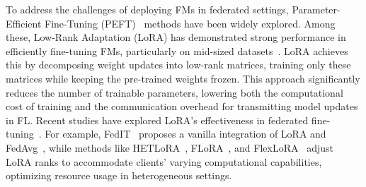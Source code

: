 \documentclass[sigconf]{acmart}
\begin{document}
To address the challenges of deploying FMs in federated settings, Parameter-Efficient Fine-Tuning (PEFT)~\cite{lester2021power} methods have been widely explored. Among these, Low-Rank Adaptation (LoRA) has demonstrated strong performance in efficiently fine-tuning FMs, particularly on mid-sized datasets~\cite{hu2021lora}. 
LoRA achieves this by decomposing weight updates into low-rank matrices, training only these matrices while keeping the pre-trained weights frozen. This approach significantly reduces the number of trainable parameters, lowering both the computational cost of training and the communication overhead for transmitting model updates in FL. 
%
%
% 
Recent studies have explored LoRA's effectiveness in federated fine-tuning~\cite{gao2025flowertune,zhang2025fed,zhang2023towards,cho2024heterogeneous,wangflora,bai2024federated}.
For example, FedIT~\cite{zhang2023towards} proposes a vanilla integration of LoRA and FedAvg~\cite{mcmahan2017communication}, while methods like
HETLoRA~\cite{cho2024heterogeneous}, FLoRA~\cite{wangflora}, and FlexLoRA~\cite{bai2024federated} adjust LoRA ranks to accommodate clients' varying computational capabilities, optimizing resource usage in heterogeneous settings.
\end{document}
